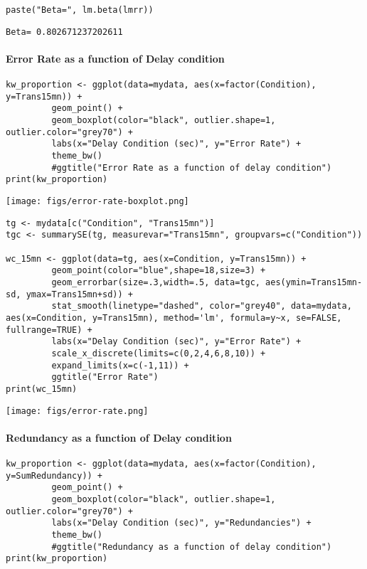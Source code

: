 \documentclass[10pt]{article}
\begin{document}
\begin{verbatim}
paste("Beta=", lm.beta(lmrr))
\end{verbatim}

\begin{verbatim}
Beta= 0.802671237202611
\end{verbatim}


\paragraph*{Error Rate as a function of Delay condition}
\label{sec-2-2-2-4}

\begin{verbatim}
kw_proportion <- ggplot(data=mydata, aes(x=factor(Condition), y=Trans15mn)) +
	     geom_point() +
	     geom_boxplot(color="black", outlier.shape=1, outlier.color="grey70") +
	     labs(x="Delay Condition (sec)", y="Error Rate") +
	     theme_bw()
	     #ggtitle("Error Rate as a function of delay condition")
print(kw_proportion)
\end{verbatim}

\texttt{[image: figs/error-rate-boxplot.png]}


\begin{verbatim}
tg <- mydata[c("Condition", "Trans15mn")]
tgc <- summarySE(tg, measurevar="Trans15mn", groupvars=c("Condition"))

wc_15mn <- ggplot(data=tg, aes(x=Condition, y=Trans15mn)) +
	     geom_point(color="blue",shape=18,size=3) +
	     geom_errorbar(size=.3,width=.5, data=tgc, aes(ymin=Trans15mn-sd, ymax=Trans15mn+sd)) +
	     stat_smooth(linetype="dashed", color="grey40", data=mydata, aes(x=Condition, y=Trans15mn), method='lm', formula=y~x, se=FALSE, fullrange=TRUE) +
	     labs(x="Delay Condition (sec)", y="Error Rate") +
	     scale_x_discrete(limits=c(0,2,4,6,8,10)) +
	     expand_limits(x=c(-1,11)) +
	     ggtitle("Error Rate")
print(wc_15mn)
\end{verbatim}

\texttt{[image: figs/error-rate.png]}



\paragraph*{Redundancy as a function of Delay condition}
\label{sec-2-2-2-5}

\begin{verbatim}
kw_proportion <- ggplot(data=mydata, aes(x=factor(Condition), y=SumRedundancy)) +
	     geom_point() +
	     geom_boxplot(color="black", outlier.shape=1, outlier.color="grey70") +
	     labs(x="Delay Condition (sec)", y="Redundancies") +
	     theme_bw()
	     #ggtitle("Redundancy as a function of delay condition")
print(kw_proportion)
\end{verbatim}
\end{document}
